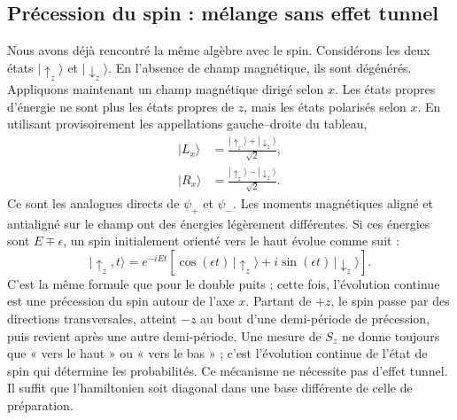 \subsection{Précession du spin : mélange sans effet tunnel}

Nous avons déjà rencontré la même algèbre avec le spin. Considérons les deux états \(|\uparrow_z\rangle\) et \(|\downarrow_z\rangle\). En l’absence de champ magnétique, ils sont dégénérés. Appliquons maintenant un champ magnétique dirigé selon \(x\). Les états propres d’énergie ne sont plus les états propres de \(z\), mais les états polarisés selon \(x\). En utilisant provisoirement les appellations gauche--droite du tableau, \begin{align}
|L_x\rangle &= \frac{|\uparrow_z\rangle+|\downarrow_z\rangle}{\sqrt{2}},\\
|R_x\rangle &= \frac{|\uparrow_z\rangle-|\downarrow_z\rangle}{\sqrt{2}}.
\end{align}Ce sont les analogues directs de \(\psi_+\) et \(\psi_-\). Les moments magnétiques aligné et antialigné sur le champ ont des énergies légèrement différentes. Si ces énergies sont \(E\mp\epsilon\), un spin initialement orienté vers le haut évolue comme suit : \begin{equation}
|\uparrow_z,t\rangle
= e^{-iEt}\left[\cos(\epsilon t)\,|\uparrow_z\rangle
+ i\sin(\epsilon t)\,|\downarrow_z\rangle\right].
\end{equation}C’est la même formule que pour le double puits ; cette fois, l’évolution continue est une précession du spin autour de l’axe \(x\). Partant de \(+z\), le spin passe par des directions transversales, atteint \(-z\) au bout d’une demi-période de précession, puis revient après une autre demi-période. Une mesure de \(S_z\) ne donne toujours que « vers le haut » ou « vers le bas » ; c’est l’évolution continue de l’état de spin qui détermine les probabilités. Ce mécanisme ne nécessite pas d’effet tunnel. Il suffit que l’hamiltonien soit diagonal dans une base différente de celle de préparation.

\begin{classroomqa}\end{classroomqa}

